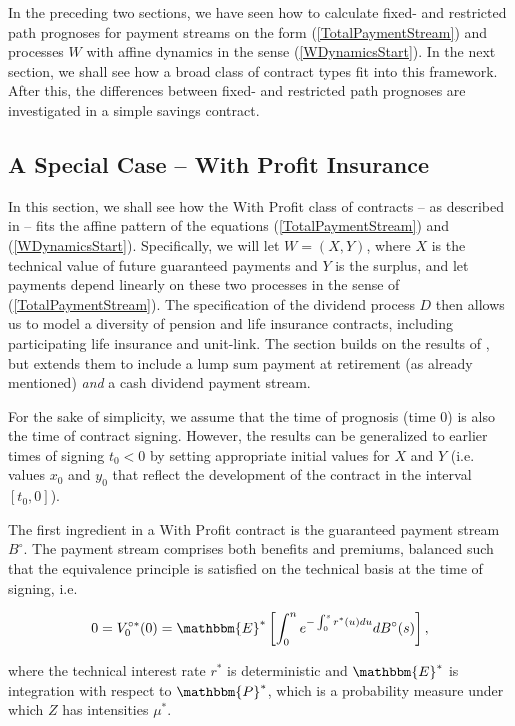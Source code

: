 \documentclass{article}
\newcommand{\1}[1]{\mathbbm{1}_{\left\lbrace #1 \right\rbrace}}
\newcommand{\expecStar}[1][def]{\mathbbm{E}^* \left[ #1 \right]}
\theoremstyle{break}
\theoremstyle{remark}
\numberwithin{equation}{section}
\begin{document}
In the preceding two sections, we have seen how to calculate fixed- and restricted path prognoses for payment streams on the form (\ref{TotalPaymentStream}) and processes $W$ with affine dynamics in the sense (\ref{WDynamicsStart}). In the next section, we shall see how a broad class of contract types fit into this framework. After this, the differences between fixed- and restricted path prognoses are investigated in a simple savings contract.

\newpage
\subsection{A Special Case -- With Profit Insurance} \label{WithProfit}

In this section, we shall see how the With Profit class of contracts -- as described in \cite{Liv2Bog} -- fits the affine pattern of the equations (\ref{TotalPaymentStream}) and (\ref{WDynamicsStart}). Specifically, we will let $W=(X,Y)$, where $X$ is the technical value of future guaranteed payments and $Y$ is the surplus, and let payments depend linearly on these two processes in the sense of (\ref{TotalPaymentStream}). The specification of the dividend process $D$ then allows us to model a diversity of pension and life insurance contracts, including participating life insurance and unit-link. The section builds on the results of \cite{Lollike}, but extends them to include a lump sum payment at retirement (as already mentioned) \textit{and} a cash dividend payment stream.

For the sake of simplicity, we assume that the time of prognosis (time 0) is also the time of contract signing. However, the results can be generalized to earlier times of signing $t_0<0$ by setting appropriate initial values for $X$ and $Y$ (i.e. values $x_0$ and $y_0$ that reflect the development of the contract in the interval $[t_0,0]$).

The first ingredient in a With Profit contract is the guaranteed payment stream $B^\circ$. The payment stream comprises both benefits and premiums, balanced such that the equivalence principle is satisfied on the technical basis at the time of signing, i.e.

\begin{align*}
0 = V_0^{\circ*}(0) = \expecStar[\int_0^n e^{-\int_0^s r^*(u) du} dB^\circ(s)],
\end{align*}

where the technical interest rate $r^*$ is deterministic and $\mathbbm{E}^*$ is integration with respect to $\mathbbm{P}^*$, which is a probability measure under which $Z$ has intensities $\mu^*$.
\end{document}
